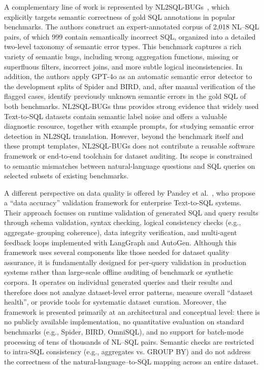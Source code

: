 \documentclass[print]{einformatica}
\begin{document}
A complementary line of work is represented by NL2SQL-BUGs~\cite{liu2025nl2sqlbugs}, which explicitly targets semantic correctness of gold SQL annotations in popular benchmarks. The authors construct an expert-annotated corpus of 2,018 NL--SQL pairs, of which 999 contain semantically incorrect SQL, organized into a detailed two-level taxonomy of semantic error types. This benchmark captures a rich variety of semantic bugs, including wrong aggregation functions, missing or superfluous filters, incorrect joins, and more subtle logical inconsistencies. In addition, the authors apply GPT-4o as an automatic semantic error detector to the development splits of Spider and BIRD, and, after manual verification of the flagged cases, identify previously unknown semantic errors in the gold SQL of both benchmarks. NL2SQL-BUGs thus provides strong evidence that widely used Text-to-SQL datasets contain semantic label noise and offers a valuable diagnostic resource, together with example prompts, for studying semantic error detection in NL2SQL translation. However, beyond the benchmark itself and these prompt templates, NL2SQL-BUGs does not contribute a reusable software framework or end-to-end toolchain for dataset auditing. Its scope is constrained to semantic mismatches between natural-language questions and SQL queries on selected subsets of existing benchmarks.

A different perspective on data quality is offered by Pandey et al.~\cite{pandey2024validation}, who propose a ``data accuracy'' validation framework for enterprise Text-to-SQL systems. Their approach focuses on runtime validation of generated SQL and query results through schema validation, syntax checking, logical consistency checks (e.g., aggregate--grouping coherence), data integrity verification, and multi-agent feedback loops implemented with LangGraph and AutoGen. Although this framework uses several components like those needed for dataset quality assurance, it is fundamentally designed for per-query validation in production systems rather than large-scale offline auditing of benchmark or synthetic corpora. It operates on individual generated queries and their results and therefore does not analyze dataset-level error patterns, measure overall ``dataset health'', or provide tools for systematic dataset curation. Moreover, the framework is presented primarily at an architectural and conceptual level: there is no publicly available implementation, no quantitative evaluation on standard benchmarks (e.g., Spider, BIRD, OmniSQL), and no support for batch-mode processing of tens of thousands of NL--SQL pairs. Semantic checks are restricted to intra-SQL consistency (e.g., aggregates vs. GROUP BY) and do not address the correctness of the natural-language--to-SQL mapping across an entire dataset.
\end{document}
